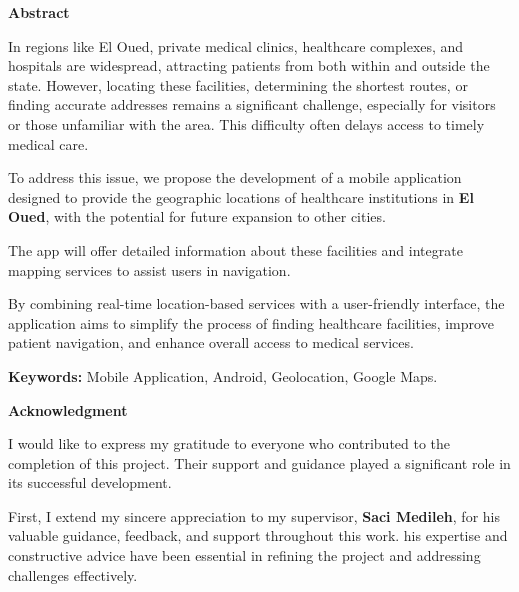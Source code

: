 \documentclass[12pt]{report}
\begin{document}
\tableofcontents
\newpage
\begin{center}
	\textbf{Abstract} \\
	\vspace*{0.3cm}
\end{center}

\noindent In regions like El Oued, private medical clinics, healthcare complexes, and hospitals are widespread, attracting patients from both within and outside the state. However, locating these facilities, determining the shortest routes, or finding accurate addresses remains a significant challenge, especially for visitors or those unfamiliar with the area. This difficulty often delays access to timely medical care. \vspace*{0.5cm}

\noindent To address this issue, we propose the development of a mobile application designed to provide the geographic locations of healthcare institutions in \textbf{El Oued}, with the potential for future expansion to other cities. \vspace*{0.5cm}

\noindent The app will offer detailed information about these facilities and integrate mapping services to assist users in navigation. \vspace*{0.5cm}

\noindent By combining real-time location-based services with a user-friendly interface, the application aims to simplify the process of finding healthcare facilities, improve patient navigation, and enhance overall access to medical services. \vspace*{0.5cm}

\noindent \vspace*{0.5cm}\textbf{Keywords:} Mobile Application, Android, Geolocation, Google Maps.
\newpage
\begin{center}
	\textbf{Acknowledgment} \\
	\vspace*{0.3cm}
\end{center}

\noindent I would like to express my gratitude to everyone who contributed to the completion of this project. Their support and guidance played a significant role in its successful development.  \vspace*{0.5cm}

\noindent First, I extend my sincere appreciation to my supervisor, \textbf{Saci Medileh}, for his valuable guidance, feedback, and support throughout this work. his expertise and constructive advice have been essential in refining the project and addressing challenges effectively. \vspace*{0cm}
\end{document}
